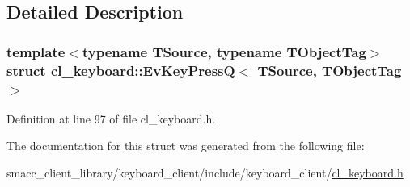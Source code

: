 \subsection{Detailed Description}
\subsubsection*{template$<$typename T\+Source, typename T\+Object\+Tag$>$\newline
struct cl\+\_\+keyboard\+::\+Ev\+Key\+Press\+Q$<$ T\+Source, T\+Object\+Tag $>$}



Definition at line 97 of file cl\+\_\+keyboard.\+h.



The documentation for this struct was generated from the following file\+:\begin{DoxyCompactItemize}
\item 
smacc\+\_\+client\+\_\+library/keyboard\+\_\+client/include/keyboard\+\_\+client/\hyperlink{cl__keyboard_8h}{cl\+\_\+keyboard.\+h}\end{DoxyCompactItemize}
